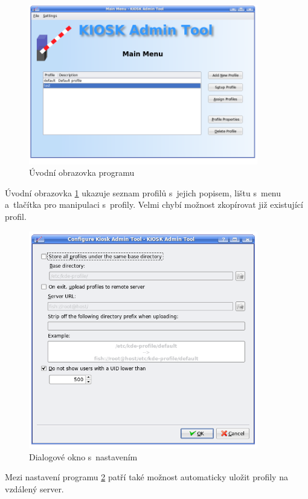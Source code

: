 \begin{figure}[h]
    \centering
    \includegraphics[width=10cm]{obrazky/KioskToolKDE3/uvodni_obrazovka.png}
    \caption{Úvodní obrazovka programu}
    \label{fig:kt3_uvodni}
\end{figure}
Úvodní obrazovka \ref{fig:kt3_uvodni} ukazuje seznam profilů s~jejich popisem, lištu s~menu a~tlačítka pro manipulaci s~profily. Velmi chybí možnost zkopírovat již existující profil.

\begin{figure}[h]
    \centering
    \includegraphics[width=10cm]{obrazky/KioskToolKDE3/nastaveni.png}
    \caption{Dialogové okno s~nastavením}
    \label{fig:kt3_nastaveni}
\end{figure}
Mezi nastavení programu \ref{fig:kt3_nastaveni} patří také možnost automaticky uložit profily na vzdálený server.


